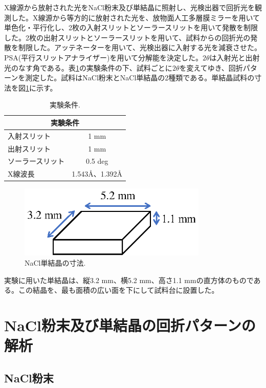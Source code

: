 \documentclass[11pt,a4j,uplatex]{jsarticle}
\begin{document}
X線源から放射された光をNaCl粉末及び単結晶に照射し、光検出器で回折光を観測した。X線源から等方的に放射された光を、放物面人工多層膜ミラーを用いて単色化・平行化し、2枚の入射スリットとソーラースリットを用いて発散を制限した。2枚の出射スリットとソーラースリットを用いて、試料からの回折光の発散を制限した。アッテネーターを用いて、光検出器に入射する光を減衰させた。PSA(平行スリットアナライザー)を用いて分解能を決定した。$2\theta$は入射光と出射光のなす角である。表\ref{exp}の実験条件の下、試料ごとに$2\theta$を変えてゆき、回折パターンを測定した。試料はNaCl粉末とNaCl単結晶の2種類である。単結晶試料の寸法を図\ref{size}に示す。

\begin{table}[ht]
 \centering
 \caption{実験条件.}
 \begin{tabular}{lc}\hline
  \multicolumn{2}{c}{実験条件}          \\ \hline
  入射スリット     & 1 mm               \\
  出射スリット     & 1 mm               \\
  ソーラースリット & 0.5 deg            \\
  X線波長          & 1.543\AA、1.392\AA \\\hline
 \end{tabular}
 \label{exp}
\end{table}

\begin{figure}[htb]
 \centering
 \includegraphics[clip,width=9cm]{bulk.eps}
 \caption{NaCl単結晶の寸法.}
 \label{size}
\end{figure}


\newpage
実験に用いた単結晶は、縦3.2 mm、横5.2 mm、高さ1.1 mmの直方体のものである。この結晶を、最も面積の広い面を下にして試料台に設置した。

\newpage
\section{NaCl粉末及び単結晶の回折パターンの解析}


\subsection{NaCl粉末}
\end{document}
